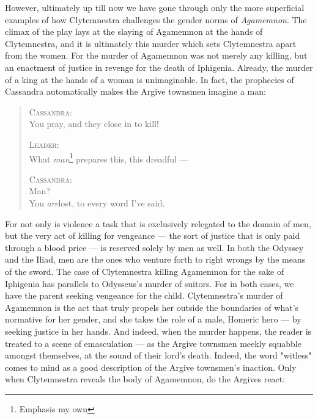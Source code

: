 However, ultimately up till now we have gone through only the more superficial
examples of how Clytemnestra challenges the gender norms of \emph{Agamemnon}.
The climax of the play lays at the slaying of Agamemnon at the hands of
Clytemnestra, and it is ultimately this murder which sets Clytemnestra apart
from the women. For the murder of Agamemnon was not merely any killing, but an
enactment of justice  in revenge for the death of Iphigenia. Already, the
murder of a king at the hands of a woman is unimaginable. In fact, the
prophecies of Cassandra automatically makes the Argive townsmen imagine a man:

\begin{quote}
  \textsc{Cassandra}: \\
  You pray, and they close in to kill!

  \textsc{Leader}: \\
  What \emph{man}\footnote{\label{note2}Emphasis my own} prepares this, this dreadful ---

  \textsc{Cassandra}: \\
  Man? \\
  You \emph{are}\footnotemark[\ref{note2}] lost, to every word I've said.

  \autocite[1262]{fagles}
\end{quote}

\noindent
For not only is violence a task that is exclusively relegated to the domain of
men, but the very act of killing for vengeance --- the sort of justice that is
only paid through a blood price --- is reserved solely by men as well. In both
the Odyssey and the Iliad, men are the ones who venture forth to right wrongs
by the means of the sword. The case of Clytemnestra killing Agamemnon for the
sake of Iphigenia has parallels to Odysseus's murder of suitors. For in both
cases, we have the parent seeking vengeance for the child. Clytemnestra's
murder of Agamemnon is the act that truly propels her outside the boundaries of
what's normative for her gender, and she takes the role of a male, Homeric hero
--- by seeking justice in her hands. And indeed, when the murder happens, the
reader is treated to a scene of emasculation --- as the Argive townsmen meekly
squabble amongst themselves, at the sound of their lord's death. Indeed, the
word "witless" comes to mind as a good description of the Argive townsmen's
inaction.  Only when Clytemnestra reveals the body of Agamemnon, do the Argives
react:

